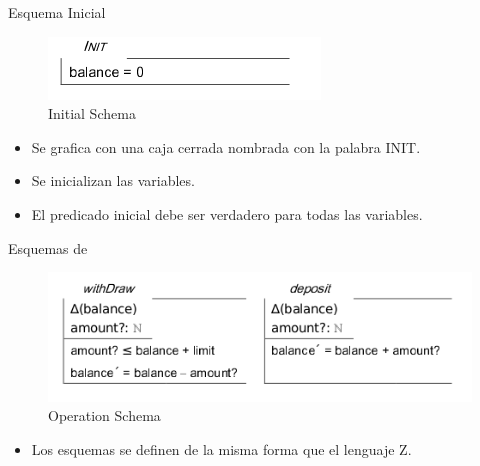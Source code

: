 \documentclass{beamer}
\begin{document}
\begin{frame}{Esquema Inicial}
  \begin{figure}
      \centering
      \includegraphics[scale=0.5]{Z5.png}
      \caption{Initial Schema }
      \label{Esquema Inicial}
  \end{figure}
  \begin{itemize}
   \item Se grafica con una caja cerrada nombrada con la palabra INIT.
   \item Se inicializan las variables.
   \item El predicado inicial debe ser verdadero para todas las variables.
  \end{itemize}
\end{frame}

\begin{frame}{Esquemas de }
  \begin{figure}
      \centering
      \includegraphics[scale=0.5]{Z6.png}
      \caption{Operation Schema}
      \label{Esquema de operacion}
  \end{figure}
 \begin{itemize}
  \item Los esquemas se definen de la misma forma que el lenguaje Z.
 \end{itemize}
\end{frame}
\end{document}
